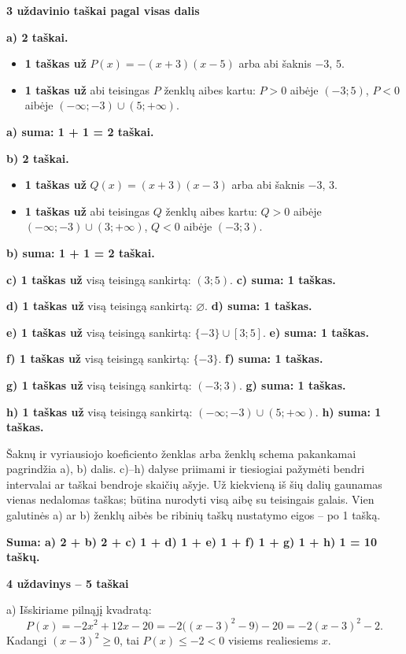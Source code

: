 \documentclass[11pt]{article}
\newcommand{\sk}[1]{\par\medskip\textbf{#1}\par}
\begin{document}
\sk{3 uždavinio taškai pagal visas dalis}
\textbf{a) 2 taškai.}\begin{itemize}
\item \textbf{1 taškas už} $P(x)=-(x+3)(x-5)$ arba abi šaknis $-3$, $5$.
\item \textbf{1 taškas už} abi teisingas $P$ ženklų aibes kartu: $P>0$ aibėje $(-3;5)$, $P<0$ aibėje $(-\infty;-3)\cup(5;+\infty)$.
\end{itemize}
\textbf{a) suma: 1 + 1 = 2 taškai.}
\par\textbf{b) 2 taškai.}\begin{itemize}
\item \textbf{1 taškas už} $Q(x)=(x+3)(x-3)$ arba abi šaknis $-3$, $3$.
\item \textbf{1 taškas už} abi teisingas $Q$ ženklų aibes kartu: $Q>0$ aibėje $(-\infty;-3)\cup(3;+\infty)$, $Q<0$ aibėje $(-3;3)$.
\end{itemize}
\textbf{b) suma: 1 + 1 = 2 taškai.}
\par\textbf{c) 1 taškas už} visą teisingą sankirtą: $(3;5)$. \textbf{c) suma: 1 taškas.}
\par\textbf{d) 1 taškas už} visą teisingą sankirtą: $\varnothing$. \textbf{d) suma: 1 taškas.}
\par\textbf{e) 1 taškas už} visą teisingą sankirtą: $\{-3\}\cup[3;5]$. \textbf{e) suma: 1 taškas.}
\par\textbf{f) 1 taškas už} visą teisingą sankirtą: $\{-3\}$. \textbf{f) suma: 1 taškas.}
\par\textbf{g) 1 taškas už} visą teisingą sankirtą: $(-3;3)$. \textbf{g) suma: 1 taškas.}
\par\textbf{h) 1 taškas už} visą teisingą sankirtą: $(-\infty;-3)\cup(5;+\infty)$. \textbf{h) suma: 1 taškas.}
\par Šaknų ir vyriausiojo koeficiento ženklas arba ženklų schema pakankamai pagrindžia a), b) dalis. c)--h) dalyse priimami ir tiesiogiai pažymėti bendri intervalai ar taškai bendroje skaičių ašyje. Už kiekvieną iš šių dalių gaunamas vienas nedalomas taškas; būtina nurodyti visą aibę su teisingais galais. Vien galutinės a) ar b) ženklų aibės be ribinių taškų nustatymo eigos -- po 1 tašką.\par\textbf{Suma: a) 2 + b) 2 + c) 1 + d) 1 + e) 1 + f) 1 + g) 1 + h) 1 = 10 taškų.}\newpage

\sk{4 uždavinys -- 5 taškai}
a) Išskiriame pilnąjį kvadratą:
\[P(x)=- 2 x^{2} + 12 x - 20=-2\bigl((x-3)^2-9\bigr)-20=-2(x-3)^2-2.\]
Kadangi $(x-3)^2\ge0$, tai $P(x)\le-2<0$ visiems realiesiems $x$.
\end{document}
